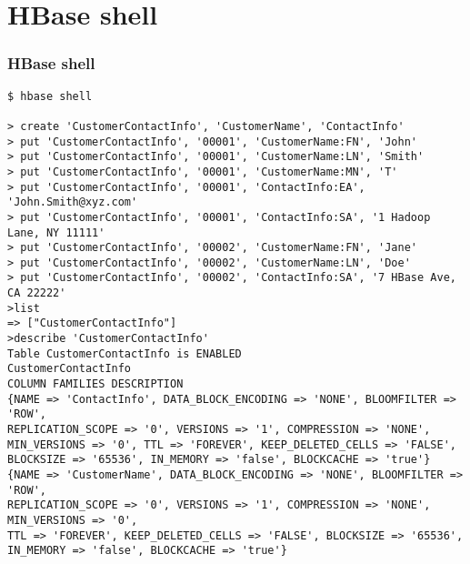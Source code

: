 \documentclass{beamer}
\begin{document}
\section{HBase shell}
\begin{frame}[fragile]
 \frametitle{HBase shell}
{\color{mycolorcli}
  \begin{lstlisting}[frame=single, basicstyle=\tiny]
$ hbase shell

> create 'CustomerContactInfo', 'CustomerName', 'ContactInfo'
> put 'CustomerContactInfo', '00001', 'CustomerName:FN', 'John'
> put 'CustomerContactInfo', '00001', 'CustomerName:LN', 'Smith'
> put 'CustomerContactInfo', '00001', 'CustomerName:MN', 'T'
> put 'CustomerContactInfo', '00001', 'ContactInfo:EA', 'John.Smith@xyz.com'
> put 'CustomerContactInfo', '00001', 'ContactInfo:SA', '1 Hadoop Lane, NY 11111'
> put 'CustomerContactInfo', '00002', 'CustomerName:FN', 'Jane'
> put 'CustomerContactInfo', '00002', 'CustomerName:LN', 'Doe'
> put 'CustomerContactInfo', '00002', 'ContactInfo:SA', '7 HBase Ave, CA 22222'
>list
=> ["CustomerContactInfo"]
>describe 'CustomerContactInfo'
Table CustomerContactInfo is ENABLED
CustomerContactInfo
COLUMN FAMILIES DESCRIPTION                                     
{NAME => 'ContactInfo', DATA_BLOCK_ENCODING => 'NONE', BLOOMFILTER => 'ROW', 
REPLICATION_SCOPE => '0', VERSIONS => '1', COMPRESSION => 'NONE', 
MIN_VERSIONS => '0', TTL => 'FOREVER', KEEP_DELETED_CELLS => 'FALSE', 
BLOCKSIZE => '65536', IN_MEMORY => 'false', BLOCKCACHE => 'true'}           
{NAME => 'CustomerName', DATA_BLOCK_ENCODING => 'NONE', BLOOMFILTER => 'ROW', 
REPLICATION_SCOPE => '0', VERSIONS => '1', COMPRESSION => 'NONE', MIN_VERSIONS => '0', 
TTL => 'FOREVER', KEEP_DELETED_CELLS => 'FALSE', BLOCKSIZE => '65536', 
IN_MEMORY => 'false', BLOCKCACHE => 'true'}                                     
  \end{lstlisting}
}
\end{frame}
\end{document}
